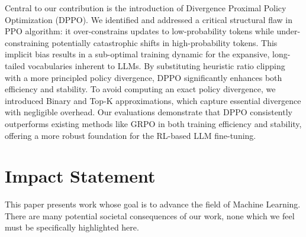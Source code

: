 \documentclass{article}
\theoremstyle{plain}
\theoremstyle{definition}
\theoremstyle{remark}
\begin{document}
Central to our contribution is the introduction of Divergence Proximal Policy Optimization (DPPO). We identified and addressed a critical structural flaw in PPO algorithm: it over-constrains updates to low-probability tokens while under-constraining potentially catastrophic shifts in high-probability tokens. 
This implicit bias results in a sub-optimal training dynamic for the expansive, long-tailed vocabularies inherent to LLMs. 
By substituting heuristic ratio clipping with a more principled policy divergence, DPPO significantly enhances both efficiency and stability. To avoid computing an exact policy divergence, we introduced Binary and Top-K approximations, which capture essential divergence with negligible overhead. Our evaluations demonstrate that DPPO consistently outperforms existing methods like GRPO in both training efficiency and stability, offering a more robust foundation for the RL-based LLM fine-tuning.



\clearpage


\section*{Impact Statement}

This paper presents work whose goal is to advance the field of Machine
Learning. There are many potential societal consequences of our work, none
which we feel must be specifically highlighted here.





\newpage
\appendix
\onecolumn


\end{document}

